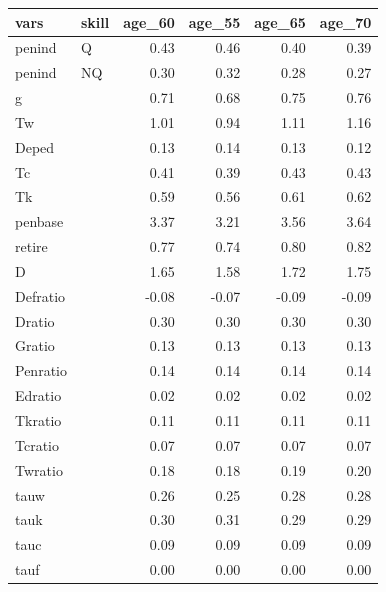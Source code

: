 \begin{tabular}{llrrrr}
  \hline
vars & skill & age\_60 & age\_55 & age\_65 & age\_70 \\ 
  \hline
penind & Q & 0.43 & 0.46 & 0.40 & 0.39 \\ 
  penind & NQ & 0.30 & 0.32 & 0.28 & 0.27 \\ 
  g &  & 0.71 & 0.68 & 0.75 & 0.76 \\ 
  Tw &  & 1.01 & 0.94 & 1.11 & 1.16 \\ 
  Deped &  & 0.13 & 0.14 & 0.13 & 0.12 \\ 
  Tc &  & 0.41 & 0.39 & 0.43 & 0.43 \\ 
  Tk &  & 0.59 & 0.56 & 0.61 & 0.62 \\ 
  penbase &  & 3.37 & 3.21 & 3.56 & 3.64 \\ 
  retire &  & 0.77 & 0.74 & 0.80 & 0.82 \\ 
  D &  & 1.65 & 1.58 & 1.72 & 1.75 \\ 
  Defratio &  & -0.08 & -0.07 & -0.09 & -0.09 \\ 
  Dratio &  & 0.30 & 0.30 & 0.30 & 0.30 \\ 
  Gratio &  & 0.13 & 0.13 & 0.13 & 0.13 \\ 
  Penratio &  & 0.14 & 0.14 & 0.14 & 0.14 \\ 
  Edratio &  & 0.02 & 0.02 & 0.02 & 0.02 \\ 
  Tkratio &  & 0.11 & 0.11 & 0.11 & 0.11 \\ 
  Tcratio &  & 0.07 & 0.07 & 0.07 & 0.07 \\ 
  Twratio &  & 0.18 & 0.18 & 0.19 & 0.20 \\ 
  tauw &  & 0.26 & 0.25 & 0.28 & 0.28 \\ 
  tauk &  & 0.30 & 0.31 & 0.29 & 0.29 \\ 
  tauc &  & 0.09 & 0.09 & 0.09 & 0.09 \\ 
  tauf &  & 0.00 & 0.00 & 0.00 & 0.00 \\ 
   \hline
\end{tabular}
